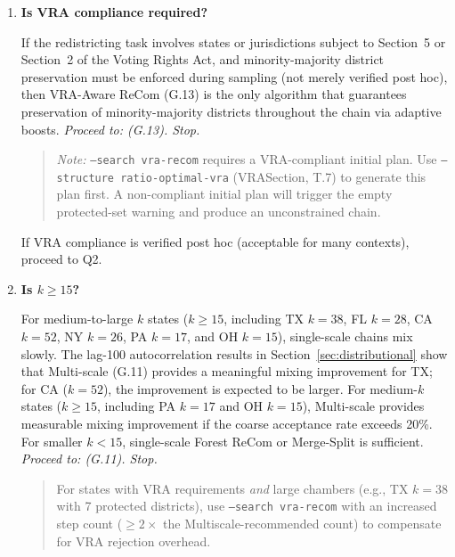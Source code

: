 \begin{enumerate}[label=\textbf{Q\arabic*.}]

  \item \textbf{Is VRA compliance required?}

    If the redistricting task involves states or jurisdictions subject to
    Section~5 or Section~2 of the Voting Rights Act, and minority-majority
    district preservation must be enforced during sampling (not merely
    verified post hoc), then VRA-Aware ReCom (G.13) is the only algorithm
    that guarantees preservation of minority-majority districts
    throughout the chain via adaptive boosts.
    \emph{Proceed to: \vra{} (G.13). Stop.}

    \begin{quote}\small
    \textit{Note:} \texttt{--search vra-recom} requires a VRA-compliant
    initial plan.
    Use \texttt{--structure ratio-optimal-vra} (VRASection, T.7) to generate
    this plan first.
    A non-compliant initial plan will trigger the empty protected-set warning
    and produce an unconstrained chain.
    \end{quote}

    If VRA compliance is verified post hoc (acceptable for many contexts),
    proceed to Q2.

  \item \textbf{Is $k \geq 15$?}

    For medium-to-large $k$ states ($k \geq 15$, including TX $k=38$,
    FL $k=28$, CA $k=52$, NY $k=26$, PA $k=17$, and OH $k=15$),
    single-scale chains mix slowly.
    The lag-100 autocorrelation results in Section~\ref{sec:distributional}
    show that Multi-scale (G.11) provides a meaningful mixing improvement
    for TX; for CA ($k=52$), the improvement is expected to be larger.
    For medium-$k$ states ($k \geq 15$, including PA $k=17$ and OH $k=15$),
    Multi-scale provides measurable mixing improvement if the coarse
    acceptance rate exceeds 20\%.
    For smaller $k < 15$, single-scale Forest ReCom or Merge-Split is
    sufficient.
    \emph{Proceed to: \ms{} (G.11). Stop.}

    \begin{quote}\small
    For states with VRA requirements \emph{and} large chambers (e.g.,
    TX $k=38$ with 7 protected districts), use \texttt{--search vra-recom}
    with an increased step count ($\geq 2\times$ the Multiscale-recommended
    count) to compensate for VRA rejection overhead.
    \end{quote}


\end{enumerate}
